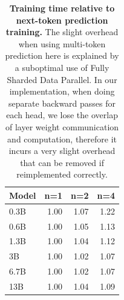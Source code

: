 \begin{table}[!h]
    \centering
        \caption{\textbf{Training time relative to next-token prediction training.} The slight overhead when using multi-token prediction here is explained by a suboptimal use of Fully Sharded Data Parallel. In our implementation, when doing separate backward passes for each head, we lose the overlap of layer weight communication and computation, therefore it incurs a very slight overhead that can be removed if reimplemented correctly.}
    \label{tab:wps}
    \begin{tabular}{lrrr}
        \toprule
        Model & n=1 & n=2 & n=4 \\
        \midrule
        0.3B & 1.00 & 1.07 & 1.22 \\
        0.6B & 1.00 & 1.05 & 1.13 \\
        1.3B & 1.00 & 1.04 & 1.12 \\
        3B & 1.00 & 1.02 & 1.07 \\
        6.7B & 1.00 & 1.02 & 1.07 \\
        13B & 1.00 & 1.04 & 1.09 \\
        \bottomrule
    \end{tabular}
\end{table}
